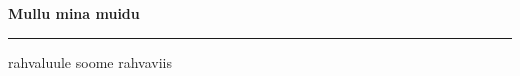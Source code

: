 \documentclass[10pt]{book}
\begin{document}
{
  \samepage
  \raggedbottom
  \raggedright
  \sloppy


  \vspace{0.2in}

  \noindent\begin{minipage}{.1\textwidth}
    \hfill\vspace{0.1in}
  \end{minipage}%
  \noindent\begin{minipage}{.8\textwidth}
    \centering
    \bfseries
    \large Mullu mina muidu
  \end{minipage}%
  \noindent\begin{minipage}{.1\textwidth}
      \hfill\vspace{0.1in}
  \end{minipage}

  \nopagebreak[4]
  \vspace{0.1in}
  \nopagebreak[4]
  \hrule height 0.05ex
  \nopagebreak[4]
  \vspace{-0.05in}

  {\footnotesize rahvaluule \hfill soome rahvaviis }\\
  \vspace{0.01in}



}
\end{document}
